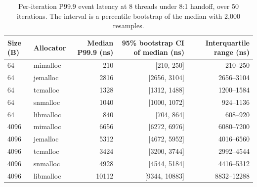 \begin{table}[!htbp]
\centering
\footnotesize
\setlength{\tabcolsep}{3pt}
\caption{Per-iteration P99.9 event latency at 8 threads under 8:1 handoff, over 50 iterations. The interval is a percentile bootstrap of the median with 2{,}000 resamples.}
\label{tab:uncertainty}
\begin{tabular}{llrrr}
\toprule
Size (B) & Allocator & Median P99.9 (ns) & 95\% bootstrap CI of median (ns) & Interquartile range (ns)\\
\midrule
64 & mimalloc & 210 & [210, 250] & 210--250 \\
64 & jemalloc & 2816 & [2656, 3104] & 2656--3104 \\
64 & tcmalloc & 1328 & [1312, 1488] & 1200--1584 \\
64 & snmalloc & 1040 & [1000, 1072] & 924--1136 \\
64 & libmalloc & 840 & [704, 864] & 608--920 \\
4096 & mimalloc & 6656 & [6272, 6976] & 6080--7200 \\
4096 & jemalloc & 5312 & [4672, 5952] & 4016--6560 \\
4096 & tcmalloc & 3424 & [3200, 3744] & 2992--4544 \\
4096 & snmalloc & 4928 & [4544, 5184] & 4416--5312 \\
4096 & libmalloc & 10112 & [9344, 10883] & 8832--12288 \\
\bottomrule
\end{tabular}
\end{table}
